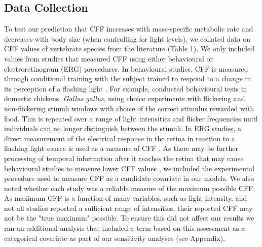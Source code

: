 \subsection{Data Collection}
To test our prediction that CFF increases with mass-specific metabolic rate and decreases with body size (when controlling for light levels), we collated data on CFF values of vertebrate species from the literature (Table 1). We only included values from studies that measured CFF using either behavioural or electroretinogram (ERG) procedures. In behavioural studies, CFF is measured through conditional training with the subject trained to respond to a change in its perception of a flashing light \citep{d1998can,rubene2010presence}. For example, \citep{lisney2011behavioural} conducted behavioural tests in domestic chickens, \textit{Gallus gallus}, using choice experiments with flickering and non-flickering stimuli windows with choice of the correct stimulus rewarded with food. This is repeated over a range of light intensities and flicker frequencies until individuals can no longer distinguish between the stimuli. In ERG studies, a direct measurement of the electrical response in the retina in reaction to a flashing light source is used as a measure of CFF \citep{d1998can,schwartz2010visual}. As there may be further processing of temporal information after it reaches the retina that may cause behavioural studies to measure lower CFF values \citep{d1998can}, we included the experimental procedure used to measure CFF as a candidate covariate in our models. We also noted whether each study was a reliable measure of the maximum possible CFF. As maximum CFF is a function of many variables, such as light intensity, and not all studies reported a sufficient range of intensities, their reported CFF may not be the "true maximum" possible. To ensure this did not affect our results we ran an additional analysis that included a term based on this assessment as a categorical covariate as part of our sensitivity analyses (see Appendix).

